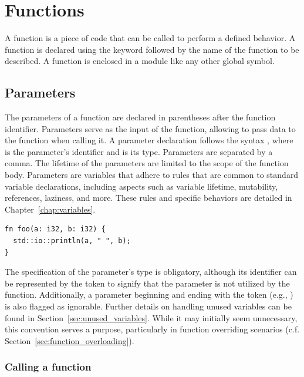 \section{Functions}%
\label{sec:functions}

A function is a piece of code that can be called to perform a defined behavior.
A function is declared using the keyword  followed by the name of the
function to be described. A function is enclosed in a module like any other
global symbol.

\subsection{Parameters}
\label{sec:function_parameters}

The parameters of a function are declared in parentheses after the function
identifier. Parameters serve as the input of the function, allowing to pass data
to the function when calling it. A parameter declaration follows the syntax
, where  is the parameter's identifier and
 is its type. Parameters are separated by a comma. The lifetime of the
parameters are limited to the scope of the function body. Parameters are
variables that adhere to rules that are common to standard variable
declarations, including aspects such as variable lifetime, mutability,
references, laziness, and more. These rules and specific behaviors are detailed
in Chapter~\ref{chap:variables}.

\begin{lstlisting}[style=coloredverbatim]
fn foo(a: i32, b: i32) {
  std::io::println(a, " ", b);
}
\end{lstlisting}

The specification of the parameter's type is obligatory, although its identifier
can be represented by the token \token{\_} to signify that the parameter is not
utilized by the function. Additionally, a parameter beginning and ending with
the token \token{\_} (e.g., ) is also flagged as ignorable. Further
details on handling unused variables can be found in
Section~\ref{sec:unused_variables}. While it may initially seem unnecessary,
this convention serves a purpose, particularly in function overriding scenarios
(c.f. Section~\ref{sec:function_overloading}).

\subsubsection*{Calling a function}

